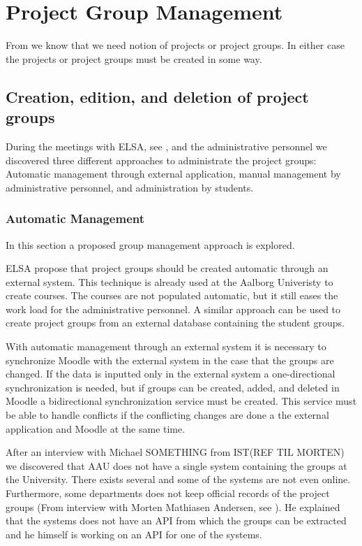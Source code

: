 \section{Project Group Management}
\label{sec:groupManagement}
From  we know that we need notion of projects or project groups. In either case the projects or project groups must be created in some way. 

\subsection{Creation, edition, and deletion of project groups} %
During the meetings with ELSA,  see , and the administrative personnel we discovered three different approaches to administrate the project groups: Automatic management through external application, manual management by administrative personnel, and administration by students. 


\subsubsection{Automatic Management}
In this section a proposed group management approach is explored.  

ELSA propose that project groups should be created automatic through an external system. 
This technique is already used at the Aalborg Univeristy to create courses. 
The courses are not populated automatic, but it still eases the work load for the administrative personnel.  
A similar approach can be used to create project groups from an external database containing the student groups. 

With automatic management through an external system it is necessary to synchronize Moodle with the external system in the case that the groups are changed. 
If the data is inputted only in the external system a one-directional synchronization is needed, but if groups can be created, added, and deleted in Moodle a bidirectional synchronization service must be created. 
This service must be able to handle conflicts if the conflicting changes are done a the external application and Moodle at the same time.

After an interview with Michael SOMETHING from IST(REF TIL MORTEN) we discovered that AAU does not have a single system containing the groups at the University.
There exists several and some of the systems are not even online.
Furthermore, some departments does not keep official records of the project groups (From interview with Morten Mathiasen Andersen, see ).
He explained that the systems does not have an API from which the groups can be extracted and he himself is working on an API for one of the systems.

